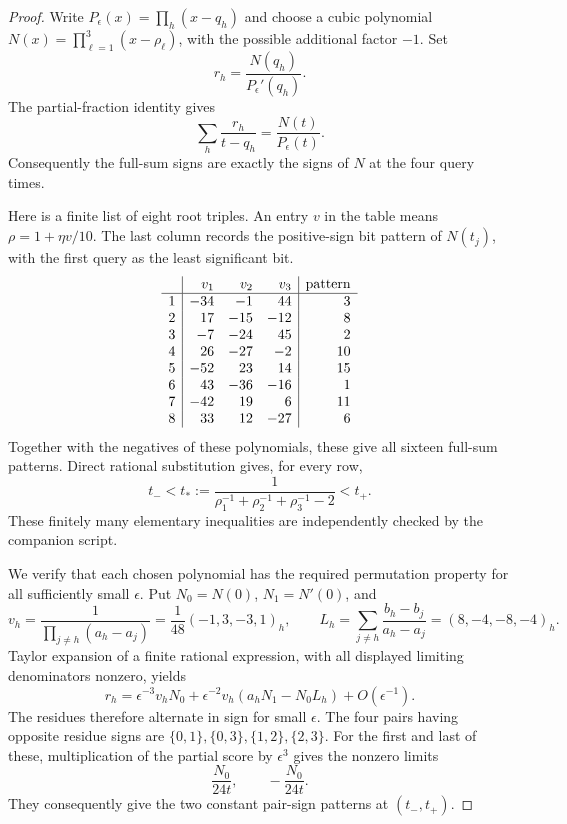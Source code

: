 \documentclass[11pt]{article}
\begin{document}
\begin{proof}
Write $P_\epsilon(x)=\prod_h(x-q_h)$ and choose a cubic polynomial
$N(x)=\prod_{\ell=1}^3(x-\rho_\ell)$, with the possible additional
factor $-1$. Set
\[
 r_h=\frac{N(q_h)}{P_\epsilon'(q_h)}.
\]
The partial-fraction identity gives
\[
 \sum_h\frac{r_h}{t-q_h}=\frac{N(t)}{P_\epsilon(t)}.
 \tag{3}\label{eq:partial}
\]
Consequently the full-sum signs are exactly the signs of $N$ at the
four query times.

Here is a finite list of eight root triples. An entry $v$ in the table
means $\rho=1+\eta v/10$. The last column records the positive-sign
bit pattern of $N(t_j)$, with the first query as the least significant
bit.
\[
\begin{array}{c|r r r|r}
 &v_1&v_2&v_3&\text{pattern}\\ \hline
1&-34&-1&44&3\\
2&17&-15&-12&8\\
3&-7&-24&45&2\\
4&26&-27&-2&10\\
5&-52&23&14&15\\
6&43&-36&-16&1\\
7&-42&19&6&11\\
8&33&12&-27&6
\end{array}
\]
Together with the negatives of these polynomials, these give all sixteen
full-sum patterns. Direct rational substitution gives, for every row,
\[
 t_-< t_*:=\frac{1}{\rho_1^{-1}+\rho_2^{-1}+\rho_3^{-1}-2}<t_+.
 \tag{4}\label{eq:zero}
\]
These finitely many elementary inequalities are independently checked
by the companion script.

We verify that each chosen polynomial has the required permutation
property for all sufficiently small $\epsilon$. Put $N_0=N(0)$,
$N_1=N'(0)$, and
\[
 v_h=\frac1{\prod_{j\ne h}(a_h-a_j)}
       =\frac1{48}(-1,3,-3,1)_h,
 \qquad
 L_h=\sum_{j\ne h}\frac{b_h-b_j}{a_h-a_j}=(8,-4,-8,-4)_h.
\]
Taylor expansion of a finite rational expression, with all displayed
limiting denominators nonzero, yields
\[
 r_h=\epsilon^{-3}v_hN_0+
       \epsilon^{-2}v_h(a_hN_1-N_0L_h)+O(\epsilon^{-1}).
 \tag{5}\label{eq:residue}
\]
The residues therefore alternate in sign for small $\epsilon$.
The four pairs having opposite residue signs are
$\{0,1\},\{0,3\},\{1,2\},\{2,3\}$.
For the first and last of these, multiplication of the partial score
by $\epsilon^3$ gives the nonzero limits
\[
 \frac{N_0}{24t},\qquad -\frac{N_0}{24t}.
\]
They consequently give the two constant pair-sign patterns at
$(t_-,t_+)$.


\end{proof}
\end{document}
